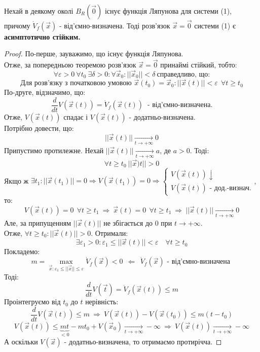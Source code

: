 \begin{boxteo}\ \\ Нехай в деякому околі $B_R(\overrightarrow{0})$ існує функція Ляпунова для системи (1), причому $\dot{V}_f (\overrightarrow{x})$ - від'ємно-визначена.
Тоді розв'язок $\overrightarrow{x} = \overrightarrow{0}$ системи (1) є \textbf{асимптотично стійким.}
\end{boxteo}

\begin{proof}
  По-перше, зауважимо, що існує функція Ляпунова.\\
  Отже, за попередньою теоремою розв'язок $\overrightarrow{x}  = \overrightarrow{0} $ принаймі стійкий, тобто:
  $$
  \forall \varepsilon  >0 \ \forall t_0 \ \exists \delta > 0 : \forall \overrightarrow{x}_0 : ||\overrightarrow{x}_0|| < \delta \ \text{справедливо, що:}
  $$
  $$
  \text{Для розв'язку з початковою умовою } \overrightarrow{x}(t_0) = \overrightarrow{x}_0 : ||\overrightarrow{x}(t)|| < \varepsilon \ \  \forall t \geq t_0
  $$
  По-друге, відзначимо, що:
  $$
  \frac{d}{dt} V (\overrightarrow{x}(t)) = \dot{V}_f ( \overrightarrow{x}(t)) \ \text{ - від'ємно-визначена.}
  $$
  Отже, $V( \overrightarrow{x} (t))$ спадає і $V(\overrightarrow{x}(t))$  - додатньо-визначена.\\
  Потрібно довести, що: $$||\overrightarrow{x} (t)|| \xrightarrow[t \to +\infty]{} 0$$
  Припустимо протилежне. Нехай $|| \overrightarrow{x}(t)|| \xrightarrow[t \to + \infty]{} a $, де $a > 0$. Тоді:
  $$
  \forall t \geq t_0 \ ||\overrightarrow{x})t||>0
  $$
  Якщо ж $\exists t_1: ||\overrightarrow{x}(t_1)|| = 0 \Rightarrow V(\overrightarrow{x}(t_1)) = 0 \Rightarrow \begin{cases}
   V(\overrightarrow{x}(t)) \! \downarrow \\
   V(\overrightarrow{x}(t)) \text{ - дод.-визнач.}
  \end{cases}$, то:
$$
V(\overrightarrow{x}(t))  = 0 \ \ \forall t \geq t_1\ \Rightarrow\ \overrightarrow{x}(t) = 0 \ \ \forall t \geq t_1\ \Rightarrow\ ||\overrightarrow{x}(t)|| \xrightarrow[ t
\to +\infty]{} 0
$$
Але, за припущенням $||\overrightarrow{x}(t)||$ не збігається до 0 при $t \to + \infty$.\\
Отже, $\forall t \geq t_0: ||\overrightarrow{x}(t)|| > 0$. Отримали:
$$
\exists \varepsilon _1 > 0 : \varepsilon_1 \leq ||\overrightarrow{x} (t)|| < \varepsilon  \quad \forall t \geq t_0
$$
Покладемо:
$$
m = \max\limits_{\overrightarrow{x}: \varepsilon_1 \leq  ||\overrightarrow{x}|| \leq \varepsilon } \dot{V}_f ( \overrightarrow{x} ) < 0 \ \  \Longleftarrow \ \ \dot{V}_f (\overrightarrow{x}) \text{ - від'ємно-визначена }
$$
Тоді:
$$
\frac{d}{dt} V(\overrightarrow{t}) = \dot{V}_f (\overrightarrow{x}(t))  \leq m
$$
Проінтегруємо від $t_0$ до $t$ нерівність:
$$
\frac{d}{dt} V(\overrightarrow{x} (t)) \leq m \ \Longrightarrow \  V(\overrightarrow{x} (t)) - V(\overrightarrow{x} (t_0)) \leq  m (t-t_0)
$$
$$
V(\overrightarrow{x}(t)) \leq \underbrace{mt}_{<0} - mt_0 + V(\overrightarrow{x}_0) \xrightarrow[t \to + \infty]{} -\infty \ \Longrightarrow \ V(\overrightarrow{x} (t)) \xrightarrow[t\to+\infty]{}  -\infty
$$
А оскільки $V(\overrightarrow{x})$ - додатньо-визначена, то отримаємо протирічча.
\end{proof}
